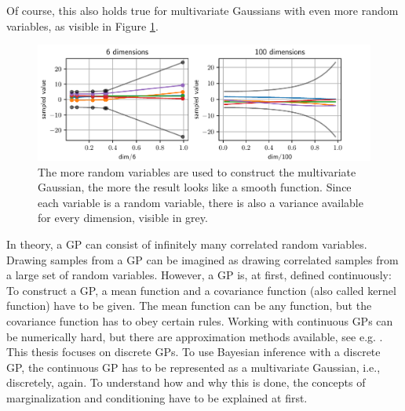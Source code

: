 \documentclass[%
  a4paper,oneside,%
  11pt,%
  smallchapters,
  style=printdev,
  extramargin,
  green,%
  rgb, <cmyk>
  ]{tubsbook}
\begin{document}
%
Of course, this also holds true for multivariate Gaussians with even more random variables, as visible in Figure \ref{fig:multiGP}.
\begin{figure}[!ht]
\begin{center}
\includegraphics[width=1\textwidth]{pics/multivarGP}
\caption[Visual explanation of the intuition behind GPs 2]{The more random variables are used to construct the multivariate Gaussian, the more the result looks like a smooth function. Since each variable is a random variable, there is also a variance available for every dimension, visible in grey.}
\label{fig:multiGP}
\end{center}
\end{figure}
%
In theory, a GP can consist of infinitely many correlated random variables. Drawing samples from a GP can be imagined as drawing correlated samples from a large set of random variables. However, a GP is, at first, defined continuously: To construct a GP, a mean function and a covariance function (also called kernel function) have to be given. The mean function can be any function, but the covariance function has to obey certain rules. Working with continuous GPs \cite{Saerkkae2013} can be numerically hard, but there are approximation methods available, see e.g. \cite{Durbin1985}. This thesis focuses on discrete GPs. To use Bayesian inference with a discrete GP, the continuous GP has to be represented as a multivariate Gaussian, i.e., discretely, again. To understand how and why this is done, the concepts of marginalization and conditioning have to be explained at first.
\end{document}
